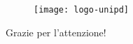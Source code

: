 \begin{frame}

  \begin{figure}[H]
    \centering
    \texttt{[image: logo-unipd]}
  \end{figure}
  
  \begin{center}
      Grazie per l'attenzione!
  \end{center}
\end{frame}
